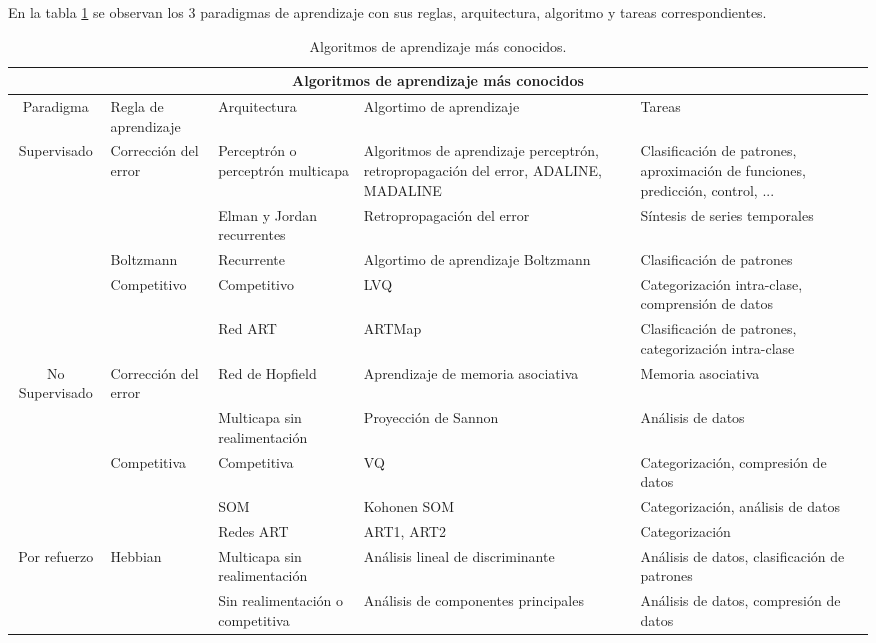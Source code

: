 		En la tabla \ref{tabla:aprendizaje} se observan los 3 paradigmas de aprendizaje con sus reglas, arquitectura, algoritmo y tareas correspondientes.

		\begin{table}[H]
			\centering
			\begin{tabular}{| c | p{3cm} | p{3cm} | p{3cm} | p{3cm} |}
				\hline
				\multicolumn{5}{|c|}{Algoritmos de aprendizaje más conocidos} \\
				\hline
				Paradigma	&	Regla de aprendizaje	&	Arquitectura	&	Algortimo de aprendizaje	&	Tareas \\
				\hline \hline
				Supervisado	&	Corrección del error	&	Perceptrón o perceptrón multicapa	&	Algoritmos de aprendizaje perceptrón, retropropagación del error, ADALINE, MADALINE	&	Clasificación de patrones, aproximación de funciones, predicción, control, ... \\

				&	&	Elman y Jordan recurrentes	&	Retropropagación del error	&	Síntesis de series temporales\\

			&	Boltzmann	&	Recurrente	&	Algortimo de aprendizaje Boltzmann	&	Clasificación de patrones\\

			&	Competitivo	&	Competitivo	&	LVQ	&	Categorización intra-clase, comprensión de datos\\
			
			&	&	Red ART	&	ARTMap	&	Clasificación de patrones, categorización intra-clase\\
			\hline

			No Supervisado	&	Corrección del error	&	Red de Hopfield	&	Aprendizaje de memoria asociativa	&	Memoria asociativa\\
			&	&	Multicapa sin realimentación	&	Proyección de Sannon	&	Análisis de datos\\

			&	Competitiva	&	Competitiva	&	VQ	&	Categorización, compresión de datos\\

			&	&	SOM	&	Kohonen SOM	&	Categorización, análisis de datos\\

			&	&	Redes ART	&	ART1, ART2	&	Categorización\\
			\hline

			Por refuerzo	&	Hebbian	&	Multicapa sin realimentación	&	Análisis lineal de discriminante	&	Análisis de datos, clasificación de patrones\\

			&	&	Sin realimentación o competitiva	&	Análisis de componentes principales	&	Análisis de datos, compresión de datos\\
			\hline
			\end{tabular}
			\caption{Algoritmos de aprendizaje más conocidos.}
			\label{tabla:aprendizaje}
		\end{table}

